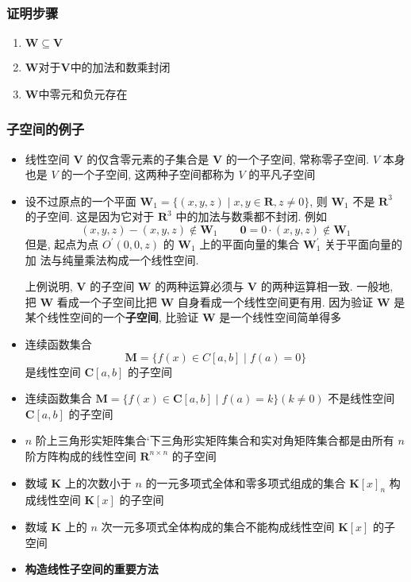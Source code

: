 \documentclass{article}
\begin{document}
				\subsubsection{证明步骤}
					\begin{enumerate}
						\item $\boldsymbol W\subseteq \boldsymbol V$
						\item $\boldsymbol W$对于$\boldsymbol V$中的加法和数乘封闭
						\item $\boldsymbol W$中零元和负元存在
					\end{enumerate}
				\subsubsection{子空间的例子}
					\begin{itemize}
						\item 线性空间 $\boldsymbol V$ 的仅含零元素的子集合是 $\boldsymbol V$ 的一个子空间, 常称零子空间. $V$ 本身也是 $V$ 的一个子空间, 这两种子空间都称为 $V$ 的平凡子空间
						\item 设不过原点的一个平面 $\boldsymbol W_{1}=\{(x, y, z) \mid x, y \in \mathbf{R}, z \neq 0\}$, 则 $\boldsymbol W_{1}$ 不是 $\mathbf{R}^{3}$ 的子空间. 这是因为它对于 $\mathbf{R}^{3}$ 中的加法与数乘都不封闭. 例如
						$$
						(x, y, z)-(x, y, z) \notin \boldsymbol W_{1} \qquad \mathbf{0}=0 \cdot(x, y, z) \notin \boldsymbol W_{1}
						$$
						但是, 起点为点 $O^{\prime}(0,0, z)$ 的 $\boldsymbol W_{1}$ 上的平面向量的集合 $\boldsymbol W_{1}^{\prime}$ 关于平面向量的加 法与纯量乘法构成一个线性空间.

						上例说明, $\boldsymbol V$ 的子空间 $\boldsymbol W$ 的两种运算必须与 $\boldsymbol V$ 的两种运算相一致. 一般地, 把 $\boldsymbol W$ 看成一个子空间比把 $\boldsymbol W$ 自身看成一个线性空间更有用. 因为验证 $\boldsymbol W$ 是某个线性空间的一个\textbf{子空间}, 比验证 $\boldsymbol W$ 是一个线性空间简单得多
						\item 连续函数集合
						$$
						\boldsymbol M=\{f(x) \in C[a, b] \mid f(a)=0\}
						$$
						是线性空间 $\boldsymbol C[a, b]$ 的子空间
						\item 连续函数集合 $\boldsymbol M=\{f(x) \in \boldsymbol C[a, b] \mid f(a)=k\}(k \neq 0)$ 不是线性空间 $\boldsymbol C[a, b]$ 的子空间
						\item $n$ 阶上三角形实矩阵集合`下三角形实矩阵集合和实对角矩阵集合都是由所有 $n$ 阶方阵构成的线性空间 $\mathbf{R}^{n \times n}$ 的子空间
						\item 数域 $\boldsymbol K$ 上的次数小于 $n$ 的一元多项式全体和零多项式组成的集合 $\boldsymbol K[x]_{n}$ 构成线性空间 $\boldsymbol K[x]$ 的子空间
						\item 数域 $\boldsymbol K$ 上的 $n$ 次一元多项式全体构成的集合不能构成线性空间 $\boldsymbol K[x]$ 的子空间
						\item \textbf{构造线性子空间的重要方法}


\end{itemize}
\end{document}
